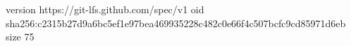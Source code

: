 version https://git-lfs.github.com/spec/v1
oid sha256:c2315b27d9a6bc5ef1e97bea469935228c482c0e66f4c507bcfc9cd85971d6eb
size 75
